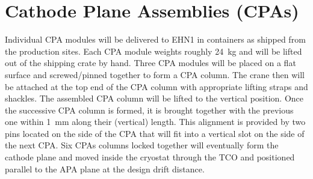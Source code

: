 

\section{Cathode Plane Assemblies (CPAs)}



Individual CPA modules will be delivered to EHN1 in containers as shipped from the production sites.  Each CPA module weights roughly 24~kg and will be lifted out of the shipping crate by hand. %
%
%
Three CPA modules will be placed on a flat surface and screwed/pinned together to form a CPA column. 
  The crane %
  then will be attached at the top end of the CPA column with appropriate lifting straps and shackles.  The assembled CPA column will be lifted to the vertical position.  
Once the successive CPA column is formed, it is brought together with the previous one within 1~mm along their (vertical) length. %
This alignment is provided by two pins located on the side of the CPA that will fit into a vertical slot on the side of the next CPA. Six CPAs columns locked together will eventually form the cathode plane and moved inside the cryostat through the TCO and positioned parallel to the APA plane at the design drift distance.

